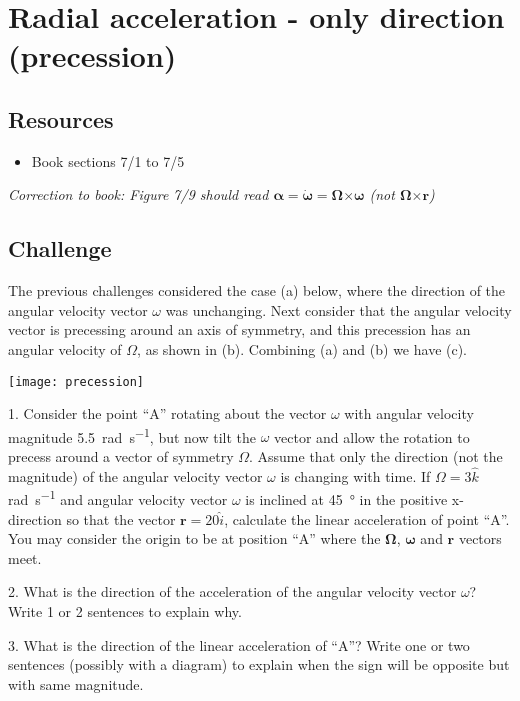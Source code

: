 \newpage
\section{Radial acceleration - only direction (precession)}

\subsection*{Resources}
\begin{itemize}
    \item Book sections 7/1 to 7/5
\end{itemize}

\emph{Correction to book: Figure 7/9 should read $\bm{\alpha} = \bm{\dot{\omega}} = \bm{\Omega} \bm{\times} \bm{\omega}$ (not $\bm{\Omega} \bm{\times} \bm{r}$)}

\subsection*{Challenge}
The previous challenges considered the case (a) below, where the direction of the angular velocity vector $\omega$ was unchanging. Next consider that the angular velocity vector is precessing around an axis of symmetry, and this precession has an angular velocity of $\Omega$, as shown in (b). Combining (a) and (b) we have (c).

\texttt{[image: precession]}

1. Consider the point ``A'' rotating about the vector $\omega$ with angular velocity magnitude \SI{5.5}{\radian\per\second}, but now tilt the $\omega$ vector and allow the rotation to precess around a vector of symmetry $\Omega$. Assume that only the direction (not the magnitude) of the angular velocity vector $\omega$ is changing with time. If $\Omega = 3\hat{k}$ \si{\radian\per\second} and angular velocity vector $\omega$ is inclined at \SI{45}{\degree} in the positive x-direction so that the vector $\bm{r} = 20\hat{i}$, calculate the linear acceleration of point ``A''. You may consider the origin to be at position ``A'' where the $\bm{\Omega}$, $\bm{\omega}$ and $\bm{r}$ vectors meet.

2. What is the direction of the acceleration of the angular velocity vector $\omega$? Write 1 or 2 sentences to explain why.

3. What is the direction of the linear acceleration of ``A''? Write one or two sentences (possibly with a diagram) to explain when the sign will be opposite but with same magnitude.


